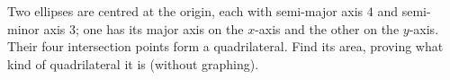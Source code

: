 Two ellipses are centred at the origin, each with semi-major axis $4$ and semi-minor axis $3$; one has its major axis on the $x$-axis and the other on the $y$-axis. Their four intersection points form a quadrilateral. Find its area, proving what kind of quadrilateral it is (without graphing).
